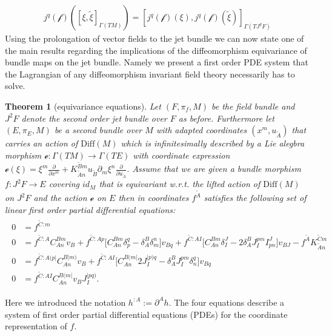 \documentclass[a4paper,12pt, DIV=14, BCOR=5mm, twoside, headsepline]{scrbook}
\newtheorem{theorem}{Theorem}[section]
\begin{document}
\begin{align}
j^q (\mathcal{f})\left ( \left [\xi, \tilde{\xi} \right ]_{\Gamma(TM)}\right) = \left [ j^q(\mathcal{f})(\xi), j^q(\mathcal{f})(\tilde{\xi}) \right ]_{\Gamma(TJ^qF)}
\end{align}
Using the prolongation of vector fields to the jet bundle we can now state one of the main results regarding the implications of the diffeomorphism equivariance of bundle maps on the jet bundle. Namely we present a first order PDE system that the Lagrangian of any diffeomorphism invariant field theory necessarily has to solve. 
\begin{theorem}[equivariance equations]
Let $(F,\pi_f,M)$ be the field bundle and $J^2F$ denote the second order jet bundle over $F$ as before. Furthermore let $(E, \pi_E, M)$ be a second bundle over $M$ with adapted coordinates $(x^m, u_{\tilde{A}})$ that carries an action of $\mathrm{Diff}(M)$ which is infinitesimally described by a Lie alegbra morphism $\mathcal{e}: \Gamma(TM) \rightarrow \Gamma(TE)$ with coordinate expression $\mathcal{e}(\xi) = \xi^m \frac{\partial}{\partial x^m} + K_{\tilde{A}n}^{\tilde{B}m} u_{\tilde{B}} \partial_m \xi^n \frac{\partial}{\partial u_{\tilde{A}}}$. Assume that we are given a bundle morphism $f : J^2F \rightarrow E$ covering $id_M$ that is equivariant w.r.t. the lifted action of $\mathrm{Diff}(M)$ on $J^2F$ and the action $\mathcal{e}$ on $E$ then in coordinates $f^{\tilde{A}}$ satisfies the following set of linear first order partial differential equations:
\begin{align}
\begin{aligned}
    0 &= f^{\tilde{C}:m} \\
    0 &= f^{\tilde{C}:A} C_{An}^{Bm} v_B + f^{\tilde{C}:Ap} \bigl[ C_{An}^{Bm} \delta_p^q - \delta_A^B \delta_m^n \bigr] v_{Bq} + f^{\tilde{C}:AI} \bigl[ C_{An}^{Bm} \delta_I^J - 2 \delta_A^B J_I^{pm} I^J_{pn}  \bigr] v_{BJ} - f^{\tilde{A}}K_{\tilde{A}n}^{\tilde{C}m}\\
    0 &= f^{\tilde{C}:A(p\vert}C_{An}^{B \vert m)} v_B + f^{\tilde{C}: AI} \bigl[ C_{An}^{B(m\vert} 2 J_I^{\vert p) q} - \delta^B_A J_I ^{pm} \delta_n^q \bigr] v_{Bq} \\
    0 &= f^{\tilde{C}:AI} C_{An}^{B(m\vert} v_B J_I^{\vert p q )}.
\end{aligned}
\end{align}
\end{theorem}
Here we introduced the notation $h^{:A} := \partial^A h$. The four equations describe a system of first order partial differential equations (PDEs) for the coordinate representation of $f$. 
\end{document}

